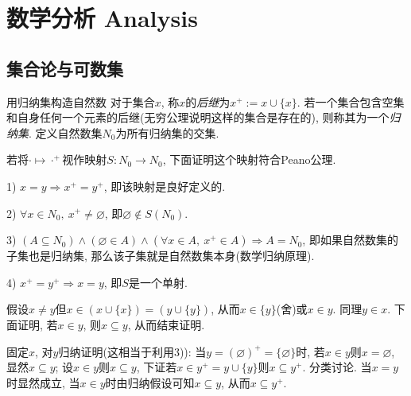 \chapter{数学分析 Analysis}


\section{集合论与可数集}

\begin{exercise}{用归纳集构造自然数}
	对于集合$x$, 称$x$的\textit{后继}为$x^+ := x \cup \{ x \}$. 若一个集合包含空集和自身任何一个元素的后继(无穷公理说明这样的集合是存在的), 则称其为一个\textit{归纳集}. 定义自然数集$N_0$为所有归纳集的交集. 

	若将$\cdot \mapsto \cdot ^{+}$视作映射$S:N_0 \to N_0$, 下面证明这个映射符合Peano公理. 

	1) $x=y \Rightarrow x^+=y^+$, 即该映射是良好定义的. 

	2) $\forall x \in N_0,~x^+ \neq \varnothing$, 即$\varnothing \notin S(N_0)$. 

	3) $(A \subseteq N_0) \wedge (\varnothing \in A) \wedge (\forall x \in A,~x^+ \in A) \Rightarrow A=N_0$, 即如果自然数集的子集也是归纳集, 那么该子集就是自然数集本身(数学归纳原理). 

	4) $x^+=y^+ \Rightarrow x=y$, 即$S$是一个单射.
\end{exercise}
\begin{solution}
	假设$x\neq y$但$x \in (x \cup \{ x \})=(y \cup \{ y \})$, 从而$x \in \{ y \}$(舍)或$x \in y$. 同理$y \in x$. 下面证明, 若$x \in y$, 则$x \subseteq y$, 从而结束证明.
	
	固定$x$, 对$y$归纳证明(这相当于利用3)): 当$y= (\varnothing )^+=\{ \varnothing \}$时, 若$x \in y$则$x = \varnothing$, 显然$x \subseteq y$; 设$x \in y$则$x \subseteq y$, 下证若$x \in y^+=y \cup \{ y \}$则$x \subseteq y^+$. 分类讨论. 当$x=y$时显然成立, 当$x \in y$时由归纳假设可知$x \subseteq y$, 从而$x \subseteq y^+$. 
\end{solution}

